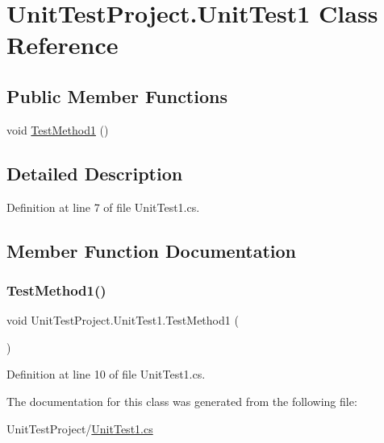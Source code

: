\hypertarget{class_unit_test_project_1_1_unit_test1}{}\section{Unit\+Test\+Project.\+Unit\+Test1 Class Reference}
\label{class_unit_test_project_1_1_unit_test1}
\subsection*{Public Member Functions}
\begin{DoxyCompactItemize}
\item 
void \mbox{\hyperlink{class_unit_test_project_1_1_unit_test1_a1cd53bf019a6a5ac0422147c8b1434da}{Test\+Method1}} ()
\end{DoxyCompactItemize}


\subsection{Detailed Description}


Definition at line 7 of file Unit\+Test1.\+cs.



\subsection{Member Function Documentation}
\mbox{\label{class_unit_test_project_1_1_unit_test1_a1cd53bf019a6a5ac0422147c8b1434da}} 
\subsubsection{\texorpdfstring{Test\+Method1()}{TestMethod1()}}
{\footnotesize\ttfamily void Unit\+Test\+Project.\+Unit\+Test1.\+Test\+Method1 (\begin{DoxyParamCaption}{ }\end{DoxyParamCaption})}



Definition at line 10 of file Unit\+Test1.\+cs.



The documentation for this class was generated from the following file\+:\begin{DoxyCompactItemize}
\item 
Unit\+Test\+Project/\mbox{\hyperlink{_unit_test1_8cs}{Unit\+Test1.\+cs}}\end{DoxyCompactItemize}
